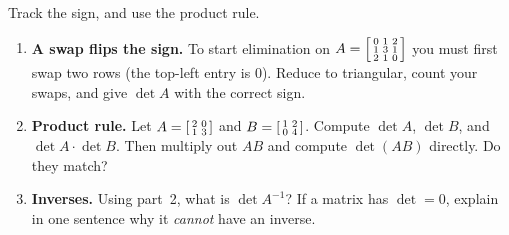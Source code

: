 \documentclass[10pt]{article}
\begin{document}
\begin{tcolorbox}[colback=white, colframe=black!40, title=\textbf{Tier A --- Approaching Proficiency},
    fonttitle=\bfseries, arc=1.5mm, left=3mm, right=3mm, top=2mm, bottom=2mm, breakable]
Track the sign, and use the product rule.
\begin{enumerate}[leftmargin=1.7em, itemsep=9pt]
  \item \textbf{A swap flips the sign.} To start elimination on
        $A=\begin{bsmallmatrix} 0 & 1 & 2 \\ 1 & 3 & 1 \\ 2 & 1 & 0 \end{bsmallmatrix}$ you must first
        swap two rows (the top-left entry is $0$). Reduce to triangular, count your swaps, and give
        $\det A$ with the correct sign. 
  \item \textbf{Product rule.} Let $A=\begin{bsmallmatrix} 2 & 0 \\ 1 & 3 \end{bsmallmatrix}$ and
        $B=\begin{bsmallmatrix} 1 & 2 \\ 0 & 4 \end{bsmallmatrix}$. Compute $\det A$, $\det B$, and
        $\det A\cdot\det B$. Then multiply out $AB$ and compute $\det(AB)$ directly. Do they match? 
  \item \textbf{Inverses.} Using part~2, what is $\det A^{-1}$? If a matrix has $\det=0$, explain in one
        sentence why it \emph{cannot} have an inverse. 
\end{enumerate}
\end{tcolorbox}
\end{document}
